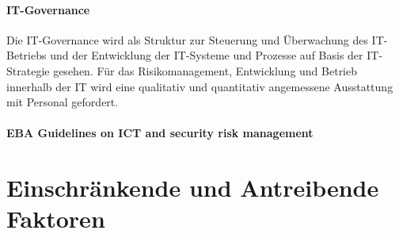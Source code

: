 \paragraph{IT-Governance} Die IT-Governance wird als Struktur zur Steuerung und Überwachung des IT-Betriebs und der Entwicklung der IT-Systeme und Prozesse auf Basis der IT-Strategie \cite{BAIT:2018} gesehen. Für das Risikomanagement, Entwicklung und Betrieb innerhalb der IT wird eine qualitativ und quantitativ angemessene Ausstattung mit Personal gefordert.

    

\paragraph{EBA Guidelines on ICT and security risk management}

\section{Einschränkende und Antreibende Faktoren}
\label{section:regulatorik-umgang}

